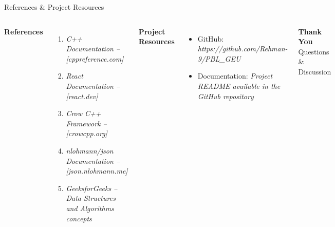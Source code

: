 \documentclass[aspectratio=169,11pt]{beamer}
\newcommand{\placeholder}[1]{%
\textit{\color{GEUGrey}#1}
}
\begin{document}
\begin{frame}{References \& Project Resources}

\begin{columns}[T,totalwidth=\textwidth]


\textbf{\color{GEUBlue}References}

\begin{enumerate}\itemsep3pt
    \item \placeholder{C++ Documentation – [cppreference.com]}
    \item \placeholder{React Documentation – [react.dev]}
    \item \placeholder{Crow C++ Framework – [crowcpp.org]}
    \item \placeholder{nlohmann/json Documentation – [json.nlohmann.me]}
    \item \placeholder{GeeksforGeeks – Data Structures and Algorithms concepts}
\end{enumerate}


\textbf{\color{GEUBlue}Project Resources}

\begin{itemize}\itemsep3pt
    \item GitHub: \placeholder{https://github.com/Rehman-
9/PBL\_GEU}
    \item Documentation: \placeholder{ Project README available in the GitHub repository}
\end{itemize}

\vfill

\begin{center}

\colorbox{GEUBlue}{
\parbox{.82\textwidth}{
\centering
\color{white}
\Large\textbf{Thank You}\\[1mm]
\normalsize Questions \& Discussion
}}

\end{center}

\end{columns}

\end{frame}
\end{document}
